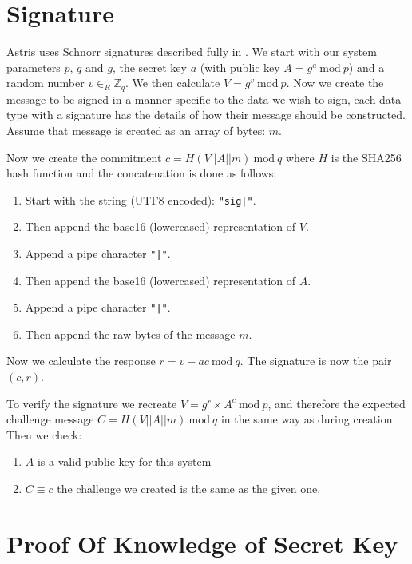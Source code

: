 \section*{Signature}
\label{proc:sign}

Astris uses Schnorr signatures described fully in . We start with our system parameters $p$, $q$ and $g$, the secret key $a$ (with public key  $A = g^a\ \textrm{mod}\ p$) and a random number $v \in_R \mathbb{Z}_q$. We then calculate $V = g^v\ \textrm{mod}\ p$. Now we create the message to be signed in a manner specific to the data we wish to sign, each data type with a signature has the details of how their message should be constructed. Assume that message is created as an array of bytes: $m$.

Now we create the commitment $c = H(V || A || m)\ \textrm{mod}\ q$ where $H$ is the SHA256 hash function and the concatenation is done as follows:

\begin{enumerate}
    \item Start with the string (UTF8 encoded): \lstinline[style=ES6]{"sig|"}.
    \item Then append the base16 (lowercased) representation of $V$.
    \item Append a pipe character \lstinline[style=ES6]{"|"}.
    \item Then append the base16 (lowercased) representation of $A$.
    \item Append a pipe character \lstinline[style=ES6]{"|"}.
    \item Then append the raw bytes of the message $m$.
\end{enumerate}

Now we calculate the response $r = v - ac\ \textrm{mod}\ q$. The signature is now the pair $(c, r)$.

To verify the signature we recreate $V = g^r \times A^c\ \textrm{mod}\ p$, and therefore the expected challenge message $C = H(V || A || m)\ \textrm{mod}\ q$ in the same way as during creation. Then we check:

\begin{enumerate}
    \item $A$ is a valid public key for this system
    \item $C \equiv c$ the challenge we created is the same as the given one.
\end{enumerate}

\section*{Proof Of Knowledge of Secret Key}
\label{proc:pok}

